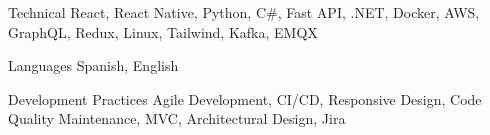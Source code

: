 
\begin{cvskills}

  \cvskill
  {Technical} %
  {React, React Native, Python, C\#, Fast API, .NET, Docker, AWS, GraphQL, Redux, Linux, Tailwind, Kafka, EMQX} %

  \cvskill
  {Languages} %
  {Spanish, English} %

  \cvskill
  {Development Practices} %
  {Agile Development, CI/CD, Responsive Design, Code Quality Maintenance, MVC, Architectural Design, Jira} %

\end{cvskills}
